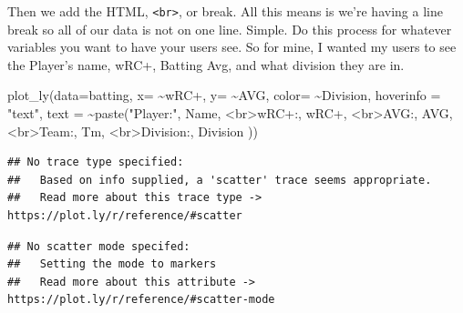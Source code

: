 \documentclass[
]{book}
\newenvironment{Shaded}{\begin{snugshade}}{\end{snugshade}}
\newcommand{\AttributeTok}[1]{\textcolor[rgb]{0.77,0.63,0.00}{#1}}
\newcommand{\FunctionTok}[1]{\textcolor[rgb]{0.00,0.00,0.00}{#1}}
\newcommand{\NormalTok}[1]{#1}
\newcommand{\SpecialCharTok}[1]{\textcolor[rgb]{0.00,0.00,0.00}{#1}}
\newcommand{\StringTok}[1]{\textcolor[rgb]{0.31,0.60,0.02}{#1}}
\begin{document}
Then we add the HTML, \texttt{\textless{}br\textgreater{}}, or break. All this means is we're having a line break so all of our data is not on one line. Simple. Do this process for whatever variables you want to have your users see. So for mine, I wanted my users to see the Player's name, wRC+, Batting Avg, and what division they are in.

\begin{Shaded}
\begin{Highlighting}[]
\FunctionTok{plot\_ly}\NormalTok{(}\AttributeTok{data=}\NormalTok{batting, }\AttributeTok{x=} \SpecialCharTok{\textasciitilde{}}\StringTok{\textasciigrave{}}\AttributeTok{wRC+}\StringTok{\textasciigrave{}}\NormalTok{, }\AttributeTok{y=} \SpecialCharTok{\textasciitilde{}}\StringTok{\textasciigrave{}}\AttributeTok{AVG}\StringTok{\textasciigrave{}}\NormalTok{, }\AttributeTok{color=} \SpecialCharTok{\textasciitilde{}}\StringTok{\textasciigrave{}}\AttributeTok{Division}\StringTok{\textasciigrave{}}\NormalTok{,}
        \AttributeTok{hoverinfo =} \StringTok{"text"}\NormalTok{,}
        \AttributeTok{text =} \SpecialCharTok{\textasciitilde{}}\FunctionTok{paste}\NormalTok{(}\StringTok{"Player:"}\NormalTok{, Name,}
                      \StringTok{\textquotesingle{}\textless{}br\textgreater{}wRC+:\textquotesingle{}}\NormalTok{, }\StringTok{\textasciigrave{}}\AttributeTok{wRC+}\StringTok{\textasciigrave{}}\NormalTok{,}
                      \StringTok{\textquotesingle{}\textless{}br\textgreater{}AVG:\textquotesingle{}}\NormalTok{, AVG,}
                      \StringTok{\textquotesingle{}\textless{}br\textgreater{}Team:\textquotesingle{}}\NormalTok{, Tm,}
                      \StringTok{\textquotesingle{}\textless{}br\textgreater{}Division:\textquotesingle{}}\NormalTok{, Division}
\NormalTok{                      ))}
\end{Highlighting}
\end{Shaded}

\begin{verbatim}
## No trace type specified:
##   Based on info supplied, a 'scatter' trace seems appropriate.
##   Read more about this trace type -> https://plot.ly/r/reference/#scatter
\end{verbatim}

\begin{verbatim}
## No scatter mode specifed:
##   Setting the mode to markers
##   Read more about this attribute -> https://plot.ly/r/reference/#scatter-mode
\end{verbatim}
\end{document}
